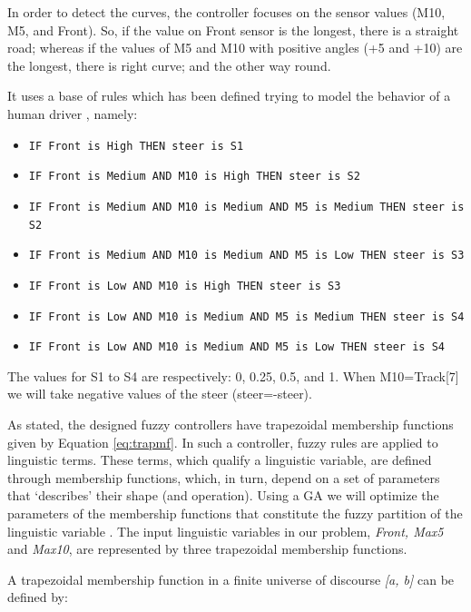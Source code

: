 \documentclass[10pt,journal,compsoc]{IEEEtran}
\begin{document}
In order to detect the curves, the controller focuses on the sensor values (M10, M5, and Front). So, if the value on Front sensor is the longest, there is a straight road; whereas if the values of M5 and M10 with positive angles (+5 and +10) are the longest, there is right curve; and the other way round.

It uses a base of rules which has been defined trying to model the behavior of a human driver \cite{salem_evo17}, namely:

 {\small
 \begin{itemize}		
 	\item \texttt{IF Front is High THEN steer is S1}
 	\item \texttt{IF Front is Medium AND M10 is High THEN  steer is S2}
 	\item \texttt{IF Front is Medium AND M10 is Medium AND M5 is Medium THEN steer is S2}
 	\item \texttt{IF Front is Medium AND M10 is Medium AND M5 is Low THEN steer is S3}
 	\item \texttt{IF Front is Low AND M10 is High THEN steer is S3}
 	\item \texttt{IF Front is Low AND M10 is Medium AND M5 is Medium THEN steer is S4}
 	\item \texttt{IF Front is Low AND M10 is Medium AND M5 is Low THEN steer is S4}
 \end{itemize}	
 }

The values for S1 to S4 are respectively: 0, 0.25, 0.5, and 1.
When M10=Track[7] we will take negative values of the steer (steer=-steer).


As stated, the designed fuzzy controllers have trapezoidal membership functions given by Equation \ref{eq:trapmf}.
In such a controller, fuzzy rules are applied to linguistic
terms. These terms, which qualify a linguistic variable, are defined
through membership functions, which, in turn, depend on a set of
parameters that `describes' their shape (and operation). Using a GA we
will optimize the parameters of the membership functions that
constitute the fuzzy partition of the linguistic variable
\cite{ThangG08}. The input linguistic variables in our problem,
\textit{Front, Max5} and \textit{Max10}, are represented by three
trapezoidal membership functions. 

A trapezoidal membership function in a finite universe of discourse \textit{[a, b]} can be defined by:
\end{document}
